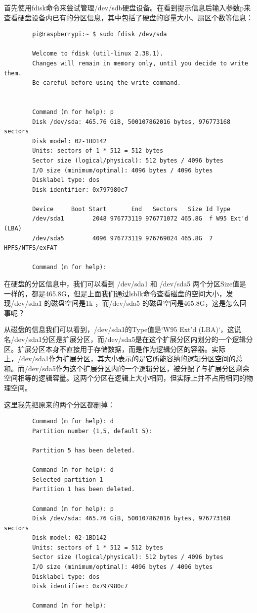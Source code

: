 \documentclass[UTF8]{article}
\begin{document}
	首先使用fdisk命令来尝试管理/dev/sdb硬盘设备。在看到提示信息后输入参数p来查看硬盘设备内已有的分区信息，其中包括了硬盘的容量大小、扇区个数等信息：
	
	\begin{lstlisting}
		pi@raspberrypi:~ $ sudo fdisk /dev/sda
		
		Welcome to fdisk (util-linux 2.38.1).
		Changes will remain in memory only, until you decide to write them.
		Be careful before using the write command.
		
		
		Command (m for help): p
		Disk /dev/sda: 465.76 GiB, 500107862016 bytes, 976773168 sectors
		Disk model: 02-1BD142
		Units: sectors of 1 * 512 = 512 bytes
		Sector size (logical/physical): 512 bytes / 4096 bytes
		I/O size (minimum/optimal): 4096 bytes / 4096 bytes
		Disklabel type: dos
		Disk identifier: 0x797980c7
		
		Device     Boot Start       End   Sectors   Size Id Type
		/dev/sda1        2048 976773119 976771072 465.8G  f W95 Ext'd (LBA)
		/dev/sda5        4096 976773119 976769024 465.8G  7 HPFS/NTFS/exFAT
		
		Command (m for help):
	\end{lstlisting}
	
	
	在硬盘的分区信息中，我们可以看到 /dev/sda1 和 /dev/sda5 两个分区Size值是一样的，都是465.8G，但是上面我们通过lsblk命令查看磁盘的空间大小，发现/dev/sda1 的磁盘空间是1k ，而/dev/sda5 的磁盘空间是465.8G，这是怎么回事呢？
	
	从磁盘的信息我们可以看到，/dev/sda1的Type值是`W95 Ext'd (LBA)`，这说名/dev/sda1分区是扩展分区，而/dev/sda5是在这个扩展分区内划分的一个逻辑分区。扩展分区本身不直接用于存储数据，而是作为逻辑分区的容器。实际上，/dev/sda1作为扩展分区，其大小表示的是它所能容纳的逻辑分区空间的总和。而/dev/sda5作为这个扩展分区内的一个逻辑分区，被分配了与扩展分区剩余空间相等的逻辑容量。这两个分区在逻辑上大小相同，但实际上并不占用相同的物理空间。
	
	这里我先把原来的两个分区都删掉：
	
	\begin{lstlisting}
		Command (m for help): d
		Partition number (1,5, default 5):
		
		Partition 5 has been deleted.
		
		Command (m for help): d
		Selected partition 1
		Partition 1 has been deleted.
		
		Command (m for help): p
		Disk /dev/sda: 465.76 GiB, 500107862016 bytes, 976773168 sectors
		Disk model: 02-1BD142
		Units: sectors of 1 * 512 = 512 bytes
		Sector size (logical/physical): 512 bytes / 4096 bytes
		I/O size (minimum/optimal): 4096 bytes / 4096 bytes
		Disklabel type: dos
		Disk identifier: 0x797980c7
		
		Command (m for help):
		
	\end{lstlisting}
	
\end{document}
